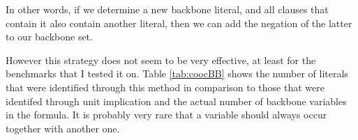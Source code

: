 In other words, if we determine a new backbone literal, and all clauses that contain it also contain another literal, then we can add the negation of the latter to our backbone set. 

However this strategy does not seem to be very effective, at least for the benchmarks that I tested it on. Table \ref{tab:coocBB} shows the number of literals that were identified through this method in comparison to those that were identifed through unit implication and the actual number of backbone variables in the formula. It is probably very rare that a variable should always occur together with another one.




